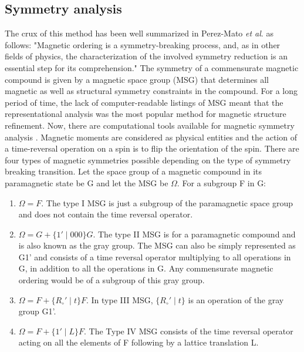 \documentclass[10pt,doublespacing,edeposit]{uiucthesis2020}
\begin{document}
\begin{mainmatter}
\section{Symmetry analysis}


The crux of this method has been well summarized in Perez-Mato \emph{et al}. \cite{Perez-Mato2015} as follows: "Magnetic ordering is a symmetry-breaking process, and, as in other fields of physics, the characterization of the involved symmetry reduction is an essential step for its comprehension." The symmetry of a commensurate magnetic compound is given by a magnetic space group (MSG) that determines all magnetic as well as structural symmetry constraints in the compound. For a long period of time, the lack of computer-readable listings of MSG meant that the representational analysis was the most popular method for magnetic structure refinement. Now, there are computational tools available for magnetic symmetry analysis \cite{Perez-Mato2015,Gallego2016_1,Gallego2016_2}. Magnetic moments are considered as physical entities and the action of a time-reversal operation on a spin is to flip the orientation of the spin. There are four types of magnetic symmetries possible depending on the type of symmetry breaking transition. Let the space group of a magnetic compound in its paramagnetic state be G and let the MSG be $\Omega$. For a subgroup F in G:

\begin{enumerate}
\item $\Omega = F$. The type I MSG is just a subgroup of the paramagnetic space group and does not contain the time reversal operator.
\item $\Omega = G + \{1' \mid 000\}G$. The type II MSG is for a paramagnetic compound and is also known as the gray group. The MSG can also be simply represented as G1' and consists of a time reversal operator multiplying to all operations in G, in addition to all the operations in G. Any commensurate magnetic ordering would be of a subgroup of this gray group.
\item $\Omega = F + \{R_\circ' \mid t\}F$. In type III MSG, $\{R_\circ' \mid t\}$ is an operation of the gray group G1'.
\item $\Omega = F + \{1' \mid L\}F$. The Type IV MSG consists of the time reversal operator acting on all the elements of F following by a lattice translation L.
\end{enumerate}


\end{mainmatter}
\end{document}
